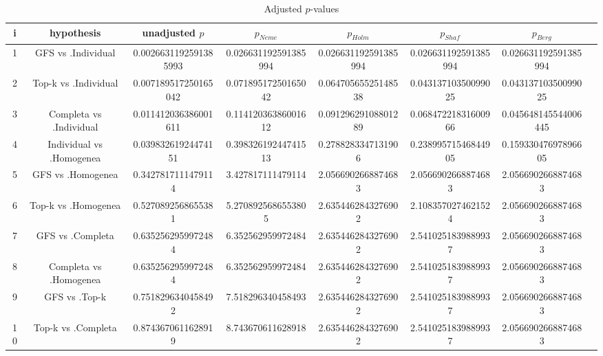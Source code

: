 \documentclass[a4paper,10pt]{article}
\begin{document}
\begin{landscape}
\begin{table}[!htp]
\centering\tiny
\caption{Adjusted $p$-values}
\begin{tabular}{cccccccc}
i&hypothesis&unadjusted $p$&$p_{Neme}$&$p_{Holm}$&$p_{Shaf}$&$p_{Berg}$\\
\hline
1&GFS vs .Individual&0.0026631192591385993&0.026631192591385994&0.026631192591385994&0.026631192591385994&0.026631192591385994\\
2&Top-k vs .Individual&0.007189517250165042&0.07189517250165042&0.06470565525148538&0.04313710350099025&0.04313710350099025\\
3&Completa vs .Individual&0.011412036386001611&0.11412036386001612&0.09129629108801289&0.06847221831600966&0.045648145544006445\\
4&Individual vs .Homogenea&0.03983261924474151&0.39832619244741513&0.2788283347131906&0.23899571546844905&0.15933047697896605\\
5&GFS vs .Homogenea&0.3427817111479114&3.427817111479114&2.0566902668874683&2.0566902668874683&2.0566902668874683\\
6&Top-k vs .Homogenea&0.5270892568655381&5.2708925686553805&2.6354462843276902&2.1083570274621524&2.0566902668874683\\
7&GFS vs .Completa&0.6352562959972484&6.352562959972484&2.6354462843276902&2.5410251839889937&2.0566902668874683\\
8&Completa vs .Homogenea&0.6352562959972484&6.352562959972484&2.6354462843276902&2.5410251839889937&2.0566902668874683\\
9&GFS vs .Top-k&0.7518296340458492&7.518296340458493&2.6354462843276902&2.5410251839889937&2.0566902668874683\\
10&Top-k vs .Completa&0.8743670611628919&8.743670611628918&2.6354462843276902&2.5410251839889937&2.0566902668874683\\
\hline
\end{tabular}
\end{table}

\end{landscape}
\end{document}
